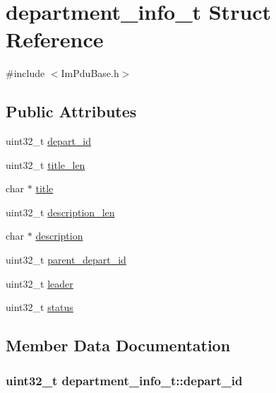 \hypertarget{structdepartment__info__t}{}\section{department\+\_\+info\+\_\+t Struct Reference}
\label{structdepartment__info__t}


{\ttfamily \#include $<$Im\+Pdu\+Base.\+h$>$}

\subsection*{Public Attributes}
\begin{DoxyCompactItemize}
\item 
uint32\+\_\+t \hyperlink{structdepartment__info__t_a0af2e36c69d379a7b81f864d0094d57f}{depart\+\_\+id}
\item 
uint32\+\_\+t \hyperlink{structdepartment__info__t_a01cb93e68dfc1f8f8cf231bdae7479da}{title\+\_\+len}
\item 
char $\ast$ \hyperlink{structdepartment__info__t_a2ede48cd32434b5be4a0745c496fe554}{title}
\item 
uint32\+\_\+t \hyperlink{structdepartment__info__t_a9cd3cd1c05084335211ba2646091d9fc}{description\+\_\+len}
\item 
char $\ast$ \hyperlink{structdepartment__info__t_aa32ef812adb7963a1de9c694ca514b4a}{description}
\item 
uint32\+\_\+t \hyperlink{structdepartment__info__t_a4b2259cb22215b10b164acdd7471e5de}{parent\+\_\+depart\+\_\+id}
\item 
uint32\+\_\+t \hyperlink{structdepartment__info__t_a286773e45a0ebf0d5395baf9acb8daec}{leader}
\item 
uint32\+\_\+t \hyperlink{structdepartment__info__t_ac592ed99e564456c8aa1afd701690ccf}{status}
\end{DoxyCompactItemize}


\subsection{Member Data Documentation}
\hypertarget{structdepartment__info__t_a0af2e36c69d379a7b81f864d0094d57f}{}
\subsubsection[{depart\+\_\+id}]{\setlength{\rightskip}{0pt plus 5cm}uint32\+\_\+t department\+\_\+info\+\_\+t\+::depart\+\_\+id}\label{structdepartment__info__t_a0af2e36c69d379a7b81f864d0094d57f}
\hypertarget{structdepartment__info__t_aa32ef812adb7963a1de9c694ca514b4a}{}
